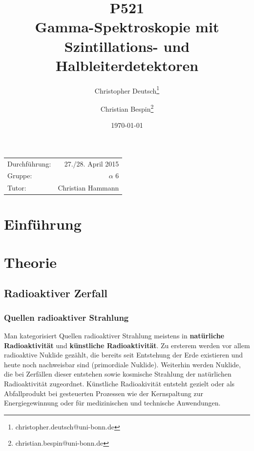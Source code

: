 \documentclass[11pt, a4paper]{article}
\title{P521 \\ Gamma-Spektroskopie mit Szintillations- und Halbleiterdetektoren}
\author{Christopher Deutsch\footnote{christopher.deutsch@uni-bonn.de} \and Christian Bespin\footnote{christian.bespin@uni-bonn.de}}
\date{\today}
\numberwithin{equation}{section}
\begin{document}
\begin{titlepage}

\maketitle

\begin{center}
\begin{tabular}{l r}
Durchführung: & 27./28. April 2015 \\
Gruppe: & $\alpha$ 6 \\
Tutor: & Christian Hammann
\end{tabular}
\end{center}

\begin{abstract}
\noindent
\end{abstract}

\end{titlepage}

\tableofcontents
\newpage


\section{Einführung}

\section{Theorie}

\subsection{Radioaktiver Zerfall}

\subsubsection{Quellen radioaktiver Strahlung}
\label{sssec:quellen_radioaktivität}
Man kategorisiert Quellen radioaktiver Strahlung meistens in \textbf{natürliche Radioaktivität} und \textbf{künstliche Radioaktivität}.
Zu ersterem werden vor allem radioaktive Nuklide gezählt, die bereits seit Entstehung der Erde existieren und heute noch nachweisbar sind (primordiale Nuklide).
Weiterhin werden Nuklide, die bei Zerfällen dieser entstehen sowie kosmische Strahlung der natürlichen Radioaktivität zugeordnet.
Künstliche Radioakivität entsteht gezielt oder als Abfallprodukt bei gesteuerten Prozessen wie der Kernspaltung zur Energiegewinnung oder für medizinischen und technische Anwendungen.
\end{document}
